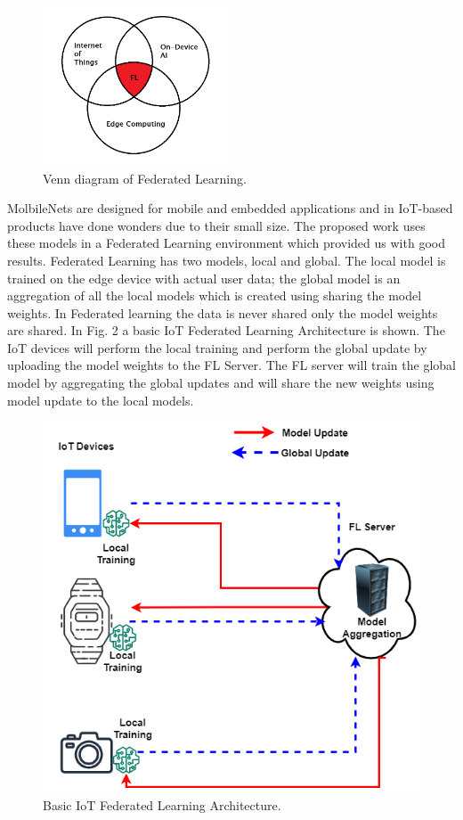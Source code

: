 \documentclass[conference]{IEEEtran}
\begin{document}
\begin{figure}[htp]
        \centering
        \includegraphics[width=0.5\textwidth]{Images/fedvenndia.png}
        \caption{Venn diagram of Federated Learning.}
    \end{figure}
MolbileNets \cite{howard2017mobilenets} are designed for mobile and embedded applications and in IoT-based products have done wonders due to their small size. The proposed work uses these models in a Federated Learning environment which provided us with good results.
Federated Learning has two models, local and global. The local model is trained on the edge device with actual user data; the global model is an aggregation of all the local models which is created using sharing the model weights. In Federated learning the data is never shared only the model weights are shared. In Fig. 2 a basic IoT Federated Learning Architecture is shown. The IoT devices will perform the local training and perform the global update by uploading the model weights to the FL Server. The FL server will train the global model by aggregating the global updates and will share the new weights using model update to the local models.
\begin{figure}[htp]
        \centering
        \includegraphics[scale=.43]{Images/IOTFED.drawio.png}
        \caption{Basic IoT Federated Learning Architecture.}
    \end{figure}
\end{document}
